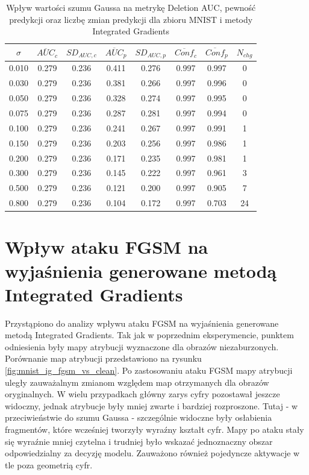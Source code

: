 \begin{table}[H]
    \centering
    \caption{Wpływ wartości szumu Gaussa na metrykę Deletion AUC, pewność predykcji oraz liczbę zmian predykcji dla zbioru MNIST i metody Integrated Gradients}
    \label{tab:gaussian_noise_auc_conf_mnist}
    \begin{tabular}{cccccccc}
    \toprule
    $\sigma$ &
    $\overline{AUC}_{c}$ &
    $SD_{AUC,c}$ &
    $\overline{AUC}_{p}$ &
    $SD_{AUC,p}$ &
    $\overline{Conf}_{c}$ &
    $\overline{Conf}_{p}$ &
    $N_{chg}$ \\
    \midrule
    0.010 & 0.279 & 0.236 & 0.411 & 0.276 & 0.997 & 0.997 & 0 \\
    0.030 & 0.279 & 0.236 & 0.381 & 0.266 & 0.997 & 0.996 & 0 \\
    0.050 & 0.279 & 0.236 & 0.328 & 0.274 & 0.997 & 0.995 & 0 \\
    0.075 & 0.279 & 0.236 & 0.287 & 0.281 & 0.997 & 0.994 & 0 \\
    0.100 & 0.279 & 0.236 & 0.241 & 0.267 & 0.997 & 0.991 & 1 \\
    0.150 & 0.279 & 0.236 & 0.203 & 0.256 & 0.997 & 0.986 & 1 \\
    0.200 & 0.279 & 0.236 & 0.171 & 0.235 & 0.997 & 0.981 & 1 \\
    0.300 & 0.279 & 0.236 & 0.145 & 0.222 & 0.997 & 0.961 & 3 \\
    0.500 & 0.279 & 0.236 & 0.121 & 0.200 & 0.997 & 0.905 & 7 \\
    0.800 & 0.279 & 0.236 & 0.104 & 0.172 & 0.997 & 0.703 & 24 \\
    \bottomrule
    \end{tabular}   
\end{table}

\section{Wpływ ataku FGSM na wyjaśnienia generowane metodą Integrated Gradients}
\label{sec:ig_vs_fgsm_mnist}

Przystąpiono do analizy wpływu ataku FGSM na wyjaśnienia generowane metodą Integrated Gradients. Tak jak w poprzednim eksperymencie, punktem odniesienia były mapy atrybucji wyznaczone dla obrazów niezaburzonych. Porównanie map atrybucji przedstawiono na rysunku \ref{fig:mnist_ig_fgsm_vs_clean}. Po zastosowaniu ataku FGSM mapy atrybucji uległy zauważalnym zmianom względem map otrzymanych dla obrazów oryginalnych. W wielu przypadkach główny zarys cyfry pozostawał jeszcze widoczny, jednak atrybucje były mniej zwarte i bardziej rozproszone. Tutaj {-} w przeciwieństwie do szumu Gaussa {-} szczególnie widoczne były osłabienia fragmentów, które wcześniej tworzyły wyraźny kształt cyfr. Mapy po ataku stały się wyraźnie mniej czytelna i trudniej było wskazać jednoznaczny obszar odpowiedzialny za decyzję modelu. Zauważono również pojedyncze aktywacje w tle poza geometrią cyfr.

